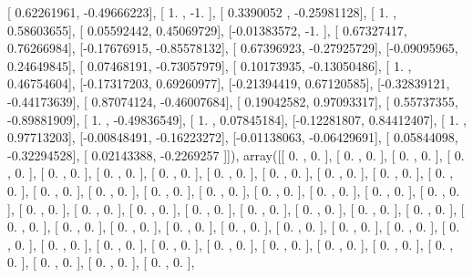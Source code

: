\documentclass{article}
\begin{document}
       [ 0.62261961, -0.49666223],
       [ 1.        , -1.        ],
       [ 0.3390052 , -0.25981128],
       [ 1.        ,  0.58603655],
       [ 0.05592442,  0.45069729],
       [-0.01383572, -1.        ],
       [ 0.67327417,  0.76266984],
       [-0.17676915, -0.85578132],
       [ 0.67396923, -0.27925729],
       [-0.09095965,  0.24649845],
       [ 0.07468191, -0.73057979],
       [ 0.10173935, -0.13050486],
       [ 1.        ,  0.46754604],
       [-0.17317203,  0.69260977],
       [-0.21394419,  0.67120585],
       [-0.32839121, -0.44173639],
       [ 0.87074124, -0.46007684],
       [ 0.19042582,  0.97093317],
       [ 0.55737355, -0.89881909],
       [ 1.        , -0.49836549],
       [ 1.        ,  0.07845184],
       [-0.12281807,  0.84412407],
       [ 1.        ,  0.97713203],
       [-0.00848491, -0.16223272],
       [-0.01138063, -0.06429691],
       [ 0.05844098, -0.32294528],
       [ 0.02143388, -0.2269257 ]]), array([[ 0.        ,  0.        ],
       [ 0.        ,  0.        ],
       [ 0.        ,  0.        ],
       [ 0.        ,  0.        ],
       [ 0.        ,  0.        ],
       [ 0.        ,  0.        ],
       [ 0.        ,  0.        ],
       [ 0.        ,  0.        ],
       [ 0.        ,  0.        ],
       [ 0.        ,  0.        ],
       [ 0.        ,  0.        ],
       [ 0.        ,  0.        ],
       [ 0.        ,  0.        ],
       [ 0.        ,  0.        ],
       [ 0.        ,  0.        ],
       [ 0.        ,  0.        ],
       [ 0.        ,  0.        ],
       [ 0.        ,  0.        ],
       [ 0.        ,  0.        ],
       [ 0.        ,  0.        ],
       [ 0.        ,  0.        ],
       [ 0.        ,  0.        ],
       [ 0.        ,  0.        ],
       [ 0.        ,  0.        ],
       [ 0.        ,  0.        ],
       [ 0.        ,  0.        ],
       [ 0.        ,  0.        ],
       [ 0.        ,  0.        ],
       [ 0.        ,  0.        ],
       [ 0.        ,  0.        ],
       [ 0.        ,  0.        ],
       [ 0.        ,  0.        ],
       [ 0.        ,  0.        ],
       [ 0.        ,  0.        ],
       [ 0.        ,  0.        ],
       [ 0.        ,  0.        ],
       [ 0.        ,  0.        ],
       [ 0.        ,  0.        ],
       [ 0.        ,  0.        ],
       [ 0.        ,  0.        ],
       [ 0.        ,  0.        ],
       [ 0.        ,  0.        ],
       [ 0.        ,  0.        ],
       [ 0.        ,  0.        ],
       [ 0.        ,  0.        ],
       [ 0.        ,  0.        ],
       [ 0.        ,  0.        ],
       [ 0.        ,  0.        ],
\end{document}
